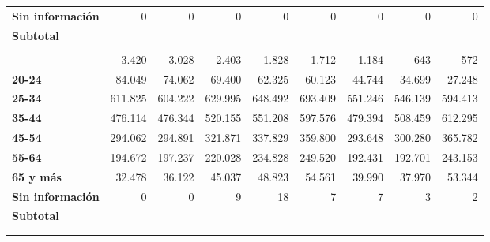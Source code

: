 \documentclass[
  letterpaper,
  DIV=11,
  numbers=noendperiod]{scrartcl}
\begin{document}
\begin{table}
\begin{tabular*}{\linewidth}{@{\extracolsep{\fill}}l|rrrrrrrr}
{\bfseries Sin información} & 0 & 0 & 0 & 0 & 0 & 0 & 0 & 0 \\ 
{\bfseries Subtotal} & {\bfseries \cellcolor[HTML]{F2F2F2}{3.159.058}} & {\bfseries \cellcolor[HTML]{F2F2F2}{3.348.560}} & {\bfseries \cellcolor[HTML]{F2F2F2}{3.664.072}} & {\bfseries \cellcolor[HTML]{F2F2F2}{4.005.604}} & {\bfseries \cellcolor[HTML]{F2F2F2}{4.311.164}} & {\bfseries \cellcolor[HTML]{F2F2F2}{4.310.302}} & {\bfseries \cellcolor[HTML]{F2F2F2}{6.368.309}} & {\bfseries \cellcolor[HTML]{F2F2F2}{7.049.916}} \\ 
\midrule\addlinespace[2.5pt]
\multicolumn{9}{l}{{\bfseries ISAPRE}} \\[2.5pt] 
\midrule\addlinespace[2.5pt]
{\bfseries 19 y menos} & 3.420 & 3.028 & 2.403 & 1.828 & 1.712 & 1.184 & 643 & 572 \\ 
{\bfseries 20-24} & 84.049 & 74.062 & 69.400 & 62.325 & 60.123 & 44.744 & 34.699 & 27.248 \\ 
{\bfseries 25-34} & 611.825 & 604.222 & 629.995 & 648.492 & 693.409 & 551.246 & 546.139 & 594.413 \\ 
{\bfseries 35-44} & 476.114 & 476.344 & 520.155 & 551.208 & 597.576 & 479.394 & 508.459 & 612.295 \\ 
{\bfseries 45-54} & 294.062 & 294.891 & 321.871 & 337.829 & 359.800 & 293.648 & 300.280 & 365.782 \\ 
{\bfseries 55-64} & 194.672 & 197.237 & 220.028 & 234.828 & 249.520 & 192.431 & 192.701 & 243.153 \\ 
{\bfseries 65 y más} & 32.478 & 36.122 & 45.037 & 48.823 & 54.561 & 39.990 & 37.970 & 53.344 \\ 
{\bfseries Sin información} & 0 & 0 & 9 & 18 & 7 & 7 & 3 & 2 \\ 
{\bfseries Subtotal} & {\bfseries \cellcolor[HTML]{F2F2F2}{1.696.620}} & {\bfseries \cellcolor[HTML]{F2F2F2}{1.685.906}} & {\bfseries \cellcolor[HTML]{F2F2F2}{1.808.898}} & {\bfseries \cellcolor[HTML]{F2F2F2}{1.885.351}} & {\bfseries \cellcolor[HTML]{F2F2F2}{2.016.708}} & {\bfseries \cellcolor[HTML]{F2F2F2}{1.602.644}} & {\bfseries \cellcolor[HTML]{F2F2F2}{1.620.894}} & {\bfseries \cellcolor[HTML]{F2F2F2}{1.896.809}} \\ 
\midrule\addlinespace[2.5pt]
\multicolumn{9}{l}{{\bfseries Totales​}} \\[2.5pt] 
\midrule\addlinespace[2.5pt]
{\bfseries Total} & {\bfseries \cellcolor[HTML]{D9D9D9}{4.855.678}} & {\bfseries \cellcolor[HTML]{D9D9D9}{5.034.466}} & {\bfseries \cellcolor[HTML]{D9D9D9}{5.472.970}} & {\bfseries \cellcolor[HTML]{D9D9D9}{5.890.955}} & {\bfseries \cellcolor[HTML]{D9D9D9}{6.327.872}} & {\bfseries \cellcolor[HTML]{D9D9D9}{5.912.946}} & {\bfseries \cellcolor[HTML]{D9D9D9}{7.989.203}} & {\bfseries \cellcolor[HTML]{D9D9D9}{8.946.725}} \\ 

\end{tabular*}
\end{table}
\end{document}
